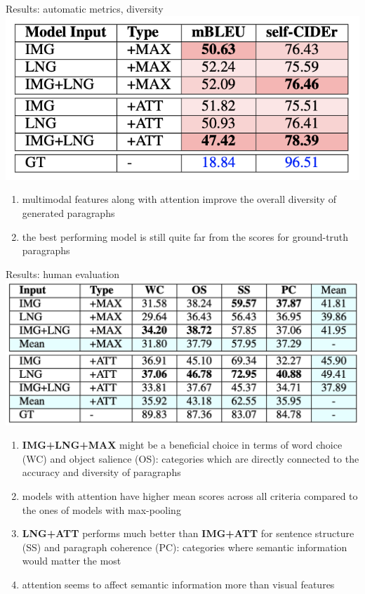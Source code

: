 \documentclass[notes=hide]{beamer}
\begin{document}
\begin{frame}{Results: automatic metrics, diversity}
\small
\center
\includegraphics[width=.7\textwidth]{res2.png}
\begin{enumerate}
\item multimodal features along with attention improve the overall diversity of generated paragraphs
\pause
\item the best performing model is still quite far from the scores for ground-truth paragraphs
\end{enumerate}
\end{frame}

\begin{frame}{Results: human evaluation}
\small
\center
\includegraphics[width=.7\textwidth]{res3.png}
\begin{enumerate}
\pause
\item \textbf{IMG+LNG+MAX} might be a beneficial choice in terms of word choice (WC) and object salience (OS): categories which are directly connected to the accuracy and diversity of paragraphs
\pause
\item models with attention have higher mean scores across all criteria compared to the ones of models with max-pooling
\pause
\item \textbf{LNG+ATT} performs much better than \textbf{IMG+ATT} for sentence structure (SS) and paragraph coherence (PC): categories where semantic information would matter the most
\pause
\item attention seems to affect semantic information more than visual features
\end{enumerate}
\end{frame}
\end{document}
